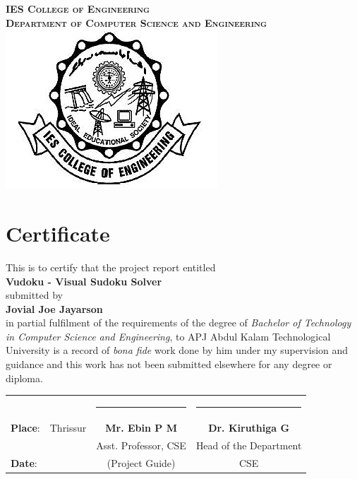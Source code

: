 \documentclass[12pt, a4paper]{report}
\begin{document}
\newpage
\thispagestyle{plain}
\vspace*{\fill}
\begin{center}
    \textbf{\textsc{IES College of Engineering}}\\[0.5cm]
    \textbf{\textsc{Department of Computer Science and Engineering}}\\[1cm]
    \includegraphics{iesce.png}
    \section*{Certificate}
    This is to certify that the project report entitled \\[0.3cm] \textbf{\large Vudoku - Visual Sudoku Solver} \\[0.3cm] submitted by \\[0.3cm] \textbf{Jovial Joe Jayarson} \\[0.3cm] in partial fulfilment of the requirements of the degree of \emph{Bachelor of Technology in Computer Science and Engineering}, to APJ Abdul Kalam Technological University is a record of \emph{bona fide}  work done by him under my supervision and guidance and this work has not been submitted elsewhere for any degree or diploma. \\[2cm]
\end{center}

\begin{table}[h]
    \centering
    \begin{tabular}{ l l c c }
                        &          & \rule{4.5cm}{0.15mm}  & \rule{4.5cm}{0.15mm}     \\
        \textbf{Place}: & Thrissur & \textbf{Mr. Ebin P M} & \textbf{Dr. Kiruthiga G} \\
                        &          & Asst. Professor, CSE  & Head of the Department   \\
        \textbf{Date}:  &          & (Project Guide)       & CSE                      \\
    \end{tabular}
\end{table}
\vspace*{\fill}
\end{document}

